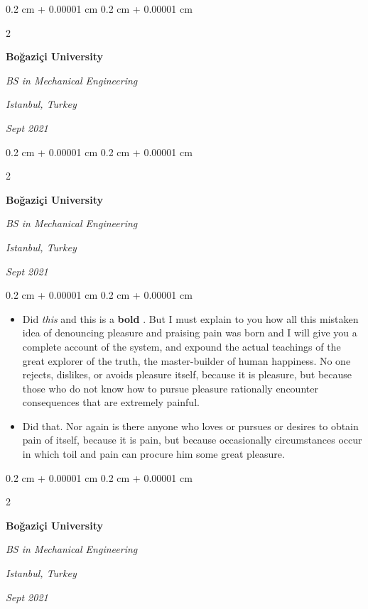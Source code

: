 \documentclass[10pt, letterpaper]{article}
\newenvironment{highlights}{
    \begin{itemize}[
        topsep=0.10 cm,
        parsep=0.10 cm,
        partopsep=0pt,
        itemsep=0pt,
        leftmargin=0.4 cm + 10pt
    ]
}{
    \end{itemize}
} %
\newenvironment{onecolentry}{
    \begin{adjustwidth}{
        0.2 cm + 0.00001 cm
    }{
        0.2 cm + 0.00001 cm
    }
}{
    \end{adjustwidth}
} %
\newenvironment{twocolentry}[2][]{
    \onecolentry
    \def\secondColumn{#2}
    \setcolumnwidth{\fill, 4.5 cm}
    \begin{paracol}{2}
}{
    \switchcolumn \raggedleft \secondColumn
    \end{paracol}
    \endonecolentry
} %
\let\hrefWithoutArrow\href
\renewcommand{\href}[2]{\hrefWithoutArrow{#1}{\ifthenelse{\equal{#2}{}}{ }{#2 }\raisebox{.15ex}{\footnotesize \faExternalLink*}}}
\begin{document}
        \vspace{0.2 cm}

        \begin{twocolentry}{
        \textit{Istanbul, Turkey}    
            
        \textit{Sept 2021}}
            \textbf{Boğaziçi University}

            \textit{BS in Mechanical Engineering}
        \end{twocolentry}



        \vspace{0.2 cm}

        \begin{twocolentry}{
        \textit{Istanbul, Turkey}    
            
        \textit{Sept 2021}}
            \textbf{Boğaziçi University}

            \textit{BS in Mechanical Engineering}
        \end{twocolentry}

        \vspace{0.10 cm}
        \begin{onecolentry}
            \begin{highlights}
                \item Did \textit{this} and this is a \textbf{bold} \href{https://example.com}{link}. But I must explain to you how all this mistaken idea of denouncing pleasure and praising pain was born and I will give you a complete account of the system, and expound the actual teachings of the great explorer of the truth, the master-builder of human happiness. No one rejects, dislikes, or avoids pleasure itself, because it is pleasure, but because those who do not know how to pursue pleasure rationally encounter consequences that are extremely painful.
                \item Did that. Nor again is there anyone who loves or pursues or desires to obtain pain of itself, because it is pain, but because occasionally circumstances occur in which toil and pain can procure him some great pleasure.
            \end{highlights}
        \end{onecolentry}


        \vspace{0.2 cm}

        \begin{twocolentry}{
        \textit{Istanbul, Turkey}    
            
        \textit{Sept 2021}}
            \textbf{Boğaziçi University}

            \textit{BS in Mechanical Engineering}
        \end{twocolentry}
\end{document}
